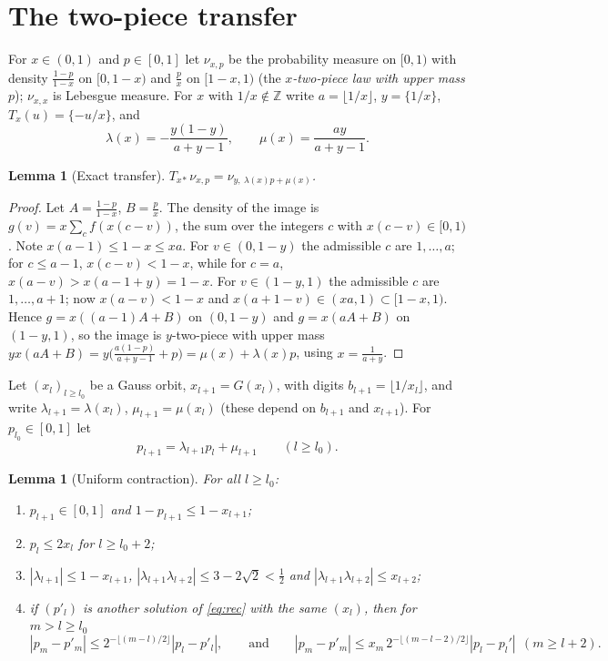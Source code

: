 \documentclass[11pt]{amsart}
\newtheorem{lemma}[theorem]{Lemma}
\theoremstyle{definition}
\numberwithin{equation}{section}
\newcommand{\Z}{\mathbb{Z}}
\newcommand{\fr}[1]{\{#1\}}
\begin{document}
\section{The two-piece transfer}\label{sec:transfer}

For $x\in(0,1)$ and $p\in[0,1]$ let $\nu_{x,p}$ be the probability measure on $[0,1)$ with density
$\frac{1-p}{1-x}$ on $[0,1-x)$ and $\frac px$ on $[1-x,1)$ (the \emph{$x$-two-piece law with upper mass $p$}); $\nu_{x,x}$ is
Lebesgue measure. For $x$ with $1/x\notin\Z$ write $a=\lfloor1/x\rfloor$, $y=\fr{1/x}$, $T_x(u)=\fr{-u/x}$, and
\begin{equation}\label{eq:lambdamu}
\lambda(x)=-\frac{y(1-y)}{a+y-1},\qquad \mu(x)=\frac{ay}{a+y-1}.
\end{equation}

\begin{lemma}[Exact transfer]\label{lem:exact}
$T_x{}_*\,\nu_{x,p}=\nu_{y,\ \lambda(x)p+\mu(x)}$.
\end{lemma}

\begin{proof}
Let $A=\frac{1-p}{1-x}$, $B=\frac px$. The density of the image is $g(v)=x\sum_cf(x(c-v))$, the sum over the integers $c$ with
$x(c-v)\in[0,1)$. Note $x(a-1)\le1-x\le xa$. For $v\in(0,1-y)$ the admissible $c$ are $1,\dots,a$; for $c\le a-1$,
$x(c-v)<1-x$, while for $c=a$, $x(a-v)>x(a-1+y)=1-x$. For $v\in(1-y,1)$ the admissible $c$ are $1,\dots,a+1$; now
$x(a-v)<1-x$ and $x(a+1-v)\in(xa,1)\subset[1-x,1)$. Hence $g=x((a-1)A+B)$ on $(0,1-y)$ and $g=x(aA+B)$ on $(1-y,1)$, so the image is
$y$-two-piece with upper mass $yx(aA+B)=y\big(\frac{a(1-p)}{a+y-1}+p\big)=\mu(x)+\lambda(x)p$, using $x=\frac1{a+y}$.
\end{proof}

Let $(x_l)_{l\ge l_0}$ be a Gauss orbit, $x_{l+1}=G(x_l)$, with digits $b_{l+1}=\lfloor1/x_l\rfloor$, and write
$\lambda_{l+1}=\lambda(x_l)$, $\mu_{l+1}=\mu(x_l)$ (these depend on $b_{l+1}$ and $x_{l+1}$). For $p_{l_0}\in[0,1]$ let
\begin{equation}\label{eq:rec}
p_{l+1}=\lambda_{l+1}p_l+\mu_{l+1}\qquad(l\ge l_0).
\end{equation}

\begin{lemma}[Uniform contraction]\label{lem:contr}
For all $l\ge l_0$:
\begin{enumerate}
\item[(i)] $p_{l+1}\in[0,1]$ and $1-p_{l+1}\le1-x_{l+1}$;
\item[(ii)] $p_{l}\le2x_{l}$ for $l\ge l_0+2$;
\item[(iii)] $|\lambda_{l+1}|\le1-x_{l+1}$, $|\lambda_{l+1}\lambda_{l+2}|\le3-2\sqrt2<\frac12$ and $|\lambda_{l+1}\lambda_{l+2}|\le x_{l+2}$;
\item[(iv)] if $(p'_l)$ is another solution of \eqref{eq:rec} with the same $(x_l)$, then for $m>l\ge l_0$
\[
|p_m-p'_m|\le 2^{-\lfloor(m-l)/2\rfloor}|p_l-p'_l|,\qquad\text{and}\qquad |p_m-p'_m|\le x_m\,2^{-\lfloor(m-l-2)/2\rfloor}|p_l-p_l'|\ \ (m\ge l+2).
\]
\end{enumerate}
\end{lemma}
\end{document}
